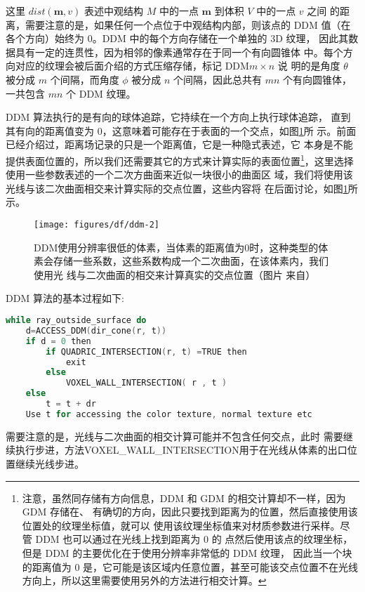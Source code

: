 这里 $dist(\mathbf{m}, {v})$ 表述中观结构 $M$ 中的一点 $\mathbf{m}$ 到体积 $V$ 中的一点 ${v}$ 之间 的距离，需要注意的是，如果任何一个点位于中观结构内部，则该点的 DDM 值（在各个方向）始终为 0。DDM 中的每个方向存储在一个单独的 3D 纹理， 因此其数据具有一定的连贯性，因为相邻的像素通常存在于同一个有向圆锥体 中。每个方向对应的纹理会被后面介绍的方式压缩存储，标记 DDM$m\times n$ 说 明的是角度 $\theta$ 被分成 $m$ 个间隔，而角度 $\phi$ 被分成 $n$ 个间隔，因此总共有 $mn$ 个有向圆锥体，一共包含 $mn$ 个 DDM 纹理。

DDM 算法执行的是有向的球体追踪，它持续在一个方向上执行球体追踪， 直到其有向的距离值变为 0，这意味着可能存在于表面的一个交点，如图\ref{f:df-ddm-2}所 示。前面已经介绍过，距离场记录的只是一个距离值，它是一种隐式表述，它 本身是不能提供表面位置的，所以我们还需要其它的方式来计算实际的表面位置\footnote{注意，虽然同存储有方向信息，DDM 和 GDM 的相交计算却不一样，因为 GDM 存储在、 有确切的方向，因此只要找到距离为的位置，然后直接使用该位置处的纹理坐标值，就可以 使用该纹理坐标值来对材质参数进行采样。尽管 DDM 也可以通过在光线上找到距离为 0 的 点然后使用该点的纹理坐标，但是 DDM 的主要优化在于使用分辨率非常低的 DDM 纹理， 因此当一个块的距离值为 0 是，它可能是该区域内任意位置，甚至可能该交点位置不在光线 方向上，所以这里需要使用另外的方法进行相交计算。}，这里选择使用一些参数表述的一个二次方曲面来近似一块很小的曲面区 域，我们将使用该光线与该二次曲面相交来计算实际的交点位置，这些内容将 在后面讨论，如图\ref{f:df-ddm-2}所示。

\begin{figure}
\sidecaption
	\texttt{[image: figures/df/ddm-2]}
	\caption{DDM使用分辨率很低的体素，当体素的距离值为0时，这种类型的体素会存储一些系数，这些系数构成一个二次曲面，在该体素内，我们使用光 线与二次曲面的相交来计算真实的交点位置（图片 来自\cite{a:directional-distance-maps}）}
	\label{f:df-ddm-2}
\end{figure}

DDM 算法的基本过程如下:

\begin{lstlisting}[language=C++, mathescape=true]
while ray_outside_surface do
	d=ACCESS_DDM(dir_cone(r, t))
	if d = 0 then
		if QUADRIC_INTERSECTION(r, t) =TRUE then
			exit
		else
			VOXEL_WALL_INTERSECTION( r , t )
	else
		t = t + dr
	Use t for accessing the color texture, normal texture etc
\end{lstlisting}

需要注意的是，光线与二次曲面的相交计算可能并不包含任何交点，此时 需要继续执行步进，方法VOXEL\_WALL\_INTERSECTION用于在光线从体素的出口位置继续光线步进。



